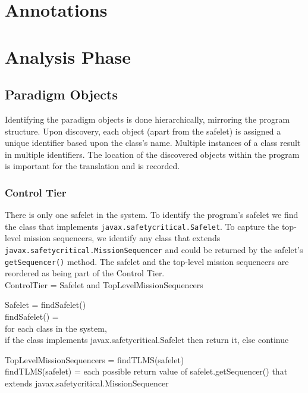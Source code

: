 \documentclass[10pt,a4paper]{article}
\newenvironment{ttSection}{\ttfamily}{\par}
\begin{document}
\section{Annotations}

\section{Analysis Phase}

\subsection{Paradigm Objects}
Identifying the paradigm objects is done hierarchically, mirroring the program structure. Upon discovery, each object (apart from the safelet) is assigned a unique identifier based upon the class's name. Multiple instances of a class result in multiple identifiers. The location of the discovered objects within the program is important for the translation and is recorded.

\subsubsection{Control Tier} 
There is only one safelet in the system. To identify the program's safelet we find the class that implements \texttt{javax.safetycritical.Safelet}. To capture the top-level mission sequencers, we identify any class that extends \texttt{javax.safetycritical.MissionSequencer} and could be returned by the safelet's \texttt{getSequencer()} method. The safelet and the top-level mission sequencers are reordered as being part of the Control Tier.  \\

\begin{ttSection}
ControlTier = Safelet and TopLevelMissionSequencers
\end{ttSection}

\begin{ttSection}
Safelet = findSafelet()\\

findSafelet() = \\
for each class in the system, \\
if the class implements javax.safetycritical.Safelet then return it, else continue
\end{ttSection}

\begin{ttSection}
TopLevelMissionSequencers = findTLMS(safelet)\\

findTLMS(safelet) = each possible return value of safelet.getSequencer() that extends javax.safetycritical.MissionSequencer
\end{ttSection}
\end{document}
